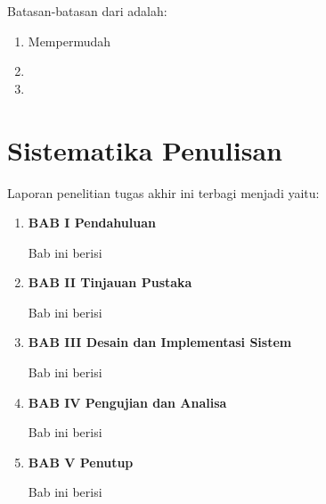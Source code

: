 Batasan-batasan dari \lipsum[1][1-3] adalah:

\begin{enumerate}[nolistsep]

  \item Mempermudah \lipsum[2][1-3]

  \item \lipsum[3][1-5]

  \item \lipsum[4][1-5]

\end{enumerate}

\section{Sistematika Penulisan}
\label{sec:sistematikapenulisan}

Laporan penelitian tugas akhir ini terbagi menjadi \lipsum[1][1-3] yaitu:

\begin{enumerate}[nolistsep]

  \item \textbf{BAB I Pendahuluan}

        Bab ini berisi \lipsum[2][1-5]

        \vspace{2ex}

  \item \textbf{BAB II Tinjauan Pustaka}

        Bab ini berisi \lipsum[3][1-5]

        \vspace{2ex}

  \item \textbf{BAB III Desain dan Implementasi Sistem}

        Bab ini berisi \lipsum[4][1-5]

        \vspace{2ex}

  \item \textbf{BAB IV Pengujian dan Analisa}

        Bab ini berisi \lipsum[5][1-5]

        \vspace{2ex}

  \item \textbf{BAB V Penutup}

        Bab ini berisi \lipsum[6][1-5]

\end{enumerate}
